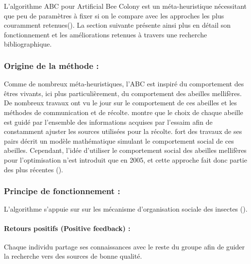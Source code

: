 L’algorithme ABC pour Artificial Bee Colony est un méta-heuristique nécessitant
que peu de paramètres à fixer si on le compare avec les approches les plus
couramment retenues().
La section suivante présente ainsi plus en détail son fonctionnement et les améliorations
retenues à travers une recherche bibliographique.



\subsubsection{Origine de la méthode :} %
\label{ssub:origine_de_la_méthode}
Comme de nombreux méta-heuristiques, l’ABC est inspiré du comportement des êtres
vivants, ici plus particulièrement, du comportement des abeilles mellifères. De nombreux
travaux ont vu le jour sur le comportement de ces abeilles et les méthodes de
communication et de récolte. \cite{Visscher19821790} montre que le choix de chaque abeille
est guidé par l’ensemble des informations acquises par l’essaim afin de constamment
ajuster les sources utilisées pour la récolte.
\cite{Camazine1991547} fort des travaux de ses pairs décrit un modèle mathématique
simulant le comportement social de ces abeilles.
Cependant, l’idée d’utiliser le comportement social des abeilles mellifères pour l’optimisation
n’est introduit que en 2005, et cette approche fait donc partie des plus récentes (\cite{Karaboga2005}).


\subsubsection{Principe de fonctionnement :} %
\label{ssub:principe_de_fonctionnement}
L’algorithme s’appuie sur sur les mécanisme d’organisation sociale des insectes (\cite{Bonabeau1999}).
\paragraph{Retours positifs (Positive feedback) :} %
\label{par:positive_feedback}
Chaque individu partage ses connaissances avec le reste du groupe afin de guider
la recherche vers des sources de bonne qualité.

